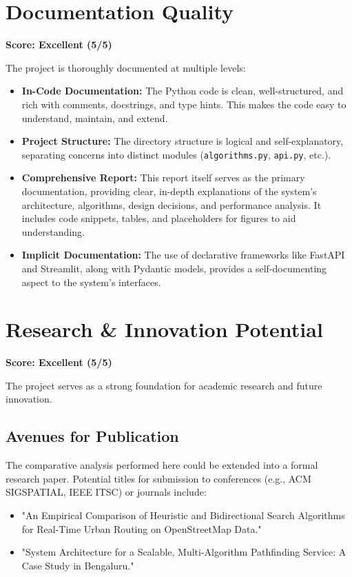 \documentclass[12pt, a4paper]{report}
\begin{document}
\section{Documentation Quality}
\textbf{Score: Excellent (5/5)}

The project is thoroughly documented at multiple levels:
\begin{itemize}
    \item \textbf{In-Code Documentation:} The Python code is clean, well-structured, and rich with comments, docstrings, and type hints. This makes the code easy to understand, maintain, and extend.
    \item \textbf{Project Structure:} The directory structure is logical and self-explanatory, separating concerns into distinct modules (\texttt{algorithms.py}, \texttt{api.py}, etc.).
    \item \textbf{Comprehensive Report:} This report itself serves as the primary documentation, providing clear, in-depth explanations of the system's architecture, algorithms, design decisions, and performance analysis. It includes code snippets, tables, and placeholders for figures to aid understanding.
    \item \textbf{Implicit Documentation:} The use of declarative frameworks like FastAPI and Streamlit, along with Pydantic models, provides a self-documenting aspect to the system's interfaces.
\end{itemize}

\section{Research \& Innovation Potential}
\textbf{Score: Excellent (5/5)}

The project serves as a strong foundation for academic research and future innovation.

\subsection{Avenues for Publication}
The comparative analysis performed here could be extended into a formal research paper. Potential titles for submission to conferences (e.g., ACM SIGSPATIAL, IEEE ITSC) or journals include:
\begin{itemize}
    \item "An Empirical Comparison of Heuristic and Bidirectional Search Algorithms for Real-Time Urban Routing on OpenStreetMap Data."
    \item "System Architecture for a Scalable, Multi-Algorithm Pathfinding Service: A Case Study in Bengaluru."
\end{itemize}
\end{document}
